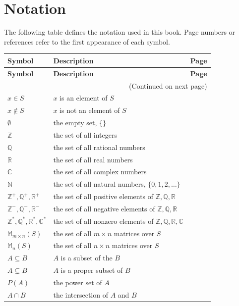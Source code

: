 \documentclass[10pt,openany,oneside]{book}
\theoremstyle{plain}
\theoremstyle{definition}
\theoremstyle{definition}
\theoremstyle{definition}
\theoremstyle{definition}
\numberwithin{equation}{section}
\def\Z{\mathbb{Z}}
\def\R{\mathbb{R}}
\def\Q{\mathbb{Q}}
\def\C{\mathbb{C}}
\def\N{\mathbb{N}}
\def\M{\mathbb{M}}
\begin{document}
\chapter[{Notation}]{Notation}\label{appendix-1}
The following table defines the notation used in this book. Page numbers or references refer to the first appearance of each symbol.%
\begin{longtable}[l]{lp{}r}
\textbf{Symbol}&\textbf{Description}&\textbf{Page}\\[1em]
\endfirsthead
\textbf{Symbol}&\textbf{Description}&\textbf{Page}\\[1em]
\endhead
\multicolumn{3}{r}{(Continued on next page)}\\
\endfoot
\endlastfoot
\(x \in S\)&\(x\) is an element of \(S\)&\pageref{notation-1}\\
\(x \not\in S\)&\(x\) is not an element of \(S\)&\pageref{notation-2}\\
\(\emptyset\)&the empty set, \(\{\}\)&\pageref{notation-3}\\
\(\Z\)&the set of all integers&\pageref{notation-4}\\
\(\Q\)&the set of all rational numbers&\pageref{notation-5}\\
\(\R\)&the set of all real numbers&\pageref{notation-6}\\
\(\C\)&the set of all complex numbers&\pageref{notation-7}\\
\(\N\)&the set of all natural numbers, \(\{0,1,2,\ldots\}\)&\pageref{notation-8}\\
\(\Z^+,\Q^+,\R^+\)&the set of all positive elements of \(\Z,\Q,\R\)&\pageref{notation-9}\\
\(\Z^-,\Q^-,\R^-\)&the set of all negative elements of \(\Z,\Q,\R\)&\pageref{notation-10}\\
\(\Z^*,\Q^*,\R^*,\C^*\)&the set of all nonzero elements of \(\Z,\Q,\R,\C\)&\pageref{notation-11}\\
\(\M_{m\times n}(S)\)&the set of all \(m \times n\) matrices over \(S\)&\pageref{notation-12}\\
\(\M_n(S)\)&the set of all \(n \times n\) matrices over \(S\)&\pageref{notation-13}\\
\(A\subseteq B\)&\(A\) is a subset of the \(B\)&\pageref{notation-14}\\
\(A\subsetneq B\)&\(A\) is a proper subset of \(B\)&\pageref{notation-15}\\
\(P(A)\)&the power set of \(A\)&\pageref{notation-16}\\
\(A\cap B\)&the intersection of  \(A\) and \(B\)&\pageref{notation-17}\\

\end{longtable}
\end{document}

